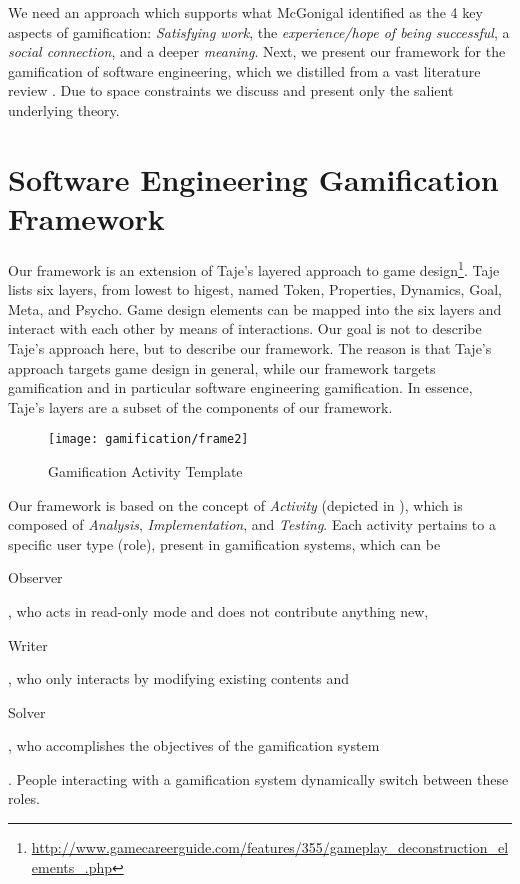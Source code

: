We need an approach which supports what McGonigal \cite{McGo2011a} identified as the 4 key aspects of gamification: {\em Satisfying work}, the {\em experience/hope of being successful}, a {\em social connection}, and a deeper {\em meaning}. Next, we present our framework for the gamification of software engineering, which we distilled from a vast literature review \cite{Mast2014a}. Due to space constraints we discuss and present only the salient underlying theory.



\section{Software Engineering Gamification Framework}\label{sec:framework}

Our framework is an extension of Taje's layered approach to game design\footnote{\url{http://www.gamecareerguide.com/features/355/gameplay_deconstruction_elements_.php}}. Taje lists six layers, from lowest to higest, named Token, Properties, Dynamics, Goal, Meta, and Psycho. Game design elements can be mapped into the six layers and interact with each other by means of interactions. Our goal is not to describe Taje's approach here, but to describe our framework. The reason is that Taje's approach targets game design in general, while our framework targets gamification and in particular software engineering gamification. In essence, Taje's layers are a subset of the components of our framework.

\begin{figure}[ht]
\centering
\texttt{[image: gamification/frame2]}
\caption{Gamification Activity Template}
\label{fig-frame}
\end{figure}

Our framework is based on the concept of {\em Activity} (depicted in ), which is composed of {\em Analysis}, {\em Implementation}, and {\em Testing}. Each activity pertains to a specific user type (role), present in gamification systems, which can be \begin{inparaenum}[i)] {\em \item Observer}, who acts in read-only mode and does not contribute anything new, {\em \item Writer}, who only interacts by modifying existing contents and {\em \item Solver}, who accomplishes the objectives of the gamification system\end{inparaenum}. People interacting with a gamification system dynamically switch between these roles. 


